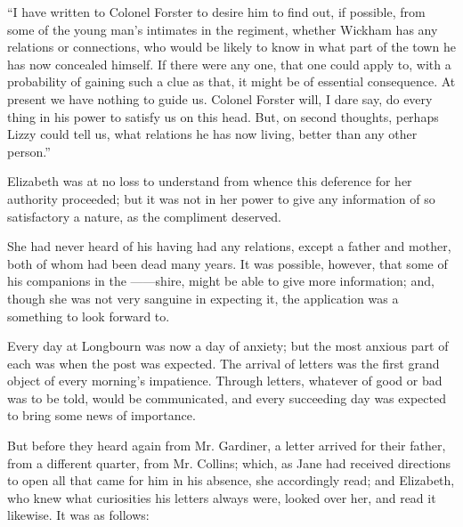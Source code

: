“I have written to Colonel Forster to desire him to
find out, if possible, from some of the young man’s intimates
in the regiment, whether Wickham has any relations
or connections, who would be likely to know in what part
of the town he has now concealed himself. If there were
any one, that one could apply to, with a probability of
gaining such a clue as that, it might be of essential consequence.
At present we have nothing to guide us. Colonel
Forster will, I dare say, do every thing in his power to
satisfy us on this head. But, on second thoughts, perhaps
Lizzy could tell us, what relations he has now living,
better than any other person.”

Elizabeth was at no loss to understand from whence
this deference for her authority proceeded; but it was
not in her power to give any information of so satisfactory
a nature, as the compliment deserved.

She had never heard of his having had any relations,
except a father and mother, both of whom had been dead
many years. It was possible, however, that some of his
companions in the ------shire, might be able to give
more information; and, though she was not very sanguine
in expecting it, the application was a something to look
forward to.

Every day at Longbourn was now a day of anxiety;
but the most anxious part of each was when the post
was expected. The arrival of letters was the first grand
object of every morning’s impatience. Through letters,
whatever of good or bad was to be told, would be communicated,
and every succeeding day was expected to
bring some news of importance.

But before they heard again from Mr. Gardiner, a letter
arrived for their father, from a different quarter, from
Mr. Collins; which, as Jane had received directions to
open all that came for him in his absence, she accordingly
read; and Elizabeth, who knew what curiosities his letters
always were, looked over her, and read it likewise. It was
as follows:

